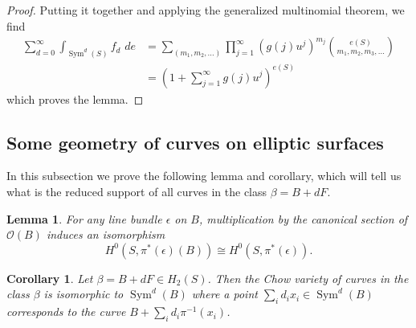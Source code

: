 \documentclass{amsart}
\newtheorem{lemma}[theorem]{Lemma}
\newtheorem{corollary}[theorem]{Corollary}
\theoremstyle{definition}
\renewcommand{\O}{\mathcal{O}}
\newcommand{\Sym}{\operatorname{Sym}}
\begin{document}
\begin{proof}
Putting it together and applying the generalized multinomial theorem,
we find
\begin{align*}
\sum _{d=0}^{\infty } \int _{\Sym ^{d} (S)}f_{d}\,\,de & = \sum _{(m_{1},m_{2},\dots )} \prod _{j=1}^{\infty } \left(g (j) u^{j} \right)^{m_{j}} \binom{e (S)}{m_{1},m_{2},m_{3},\dots }\\
&=\left(1+\sum _{j=1}^{\infty }g (j) u^{j} \right)^{e (S)}
\end{align*}
which proves the lemma.   
\end{proof}

\subsection{Some geometry of curves on elliptic surfaces}\label{subsec: geometry of curves on elliptic surfaces}

In this subsection we prove the following lemma and corollary, which will tell us what is the reduced support of all curves in the class $\beta =B+dF$.

\begin{lemma}\label{lem: H0 (pi* (D) (B))=H0 (pi* (D))}
For any line bundle $\epsilon $ on $B$, multiplication by the
canonical section of $\O (B)$ induces an isomorphism
\[
H^{0} (S,\pi ^{*} (\epsilon ) (B)) \cong H^{0} (S,\pi ^{*} (\epsilon )).
\]
\end{lemma}

\begin{corollary}\label{cor: chow(beta) = sym (B)}
Let $\beta = B+dF \in H_{2} (S)$. Then the Chow variety of curves in
the class $\beta $ is isomorphic to $\Sym ^{d} (B)$ where a point
$\sum _{i}d_{i} x_{i}\in \Sym ^{d} (B)$ corresponds to the curve
$B+\sum _{i}d_{i}\pi ^{-1} (x_{i}) $.
\end{corollary}
\end{document}
